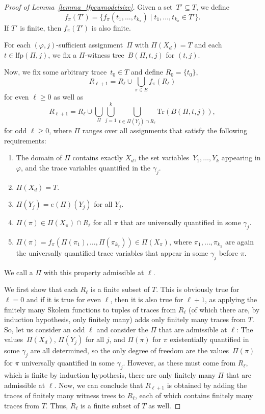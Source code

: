 \documentclass[dvipsnames,10pt,a4paper]{amsart}
\theoremstyle{definition}
\theoremstyle{remark}
\renewcommand{\phi}{\varphi}
\newcommand{\set}[1]{\{#1\}}
\newcommand{\unidisvar}{X_d}
\newcommand{\traces}{\mathrm{Tr}}
\newcommand{\lfp}{\mathrm{lfp}}
\newcommand{\tree}{B}
\newcommand{\itereval}{e}
\begin{document}
\begin{proof}[Proof of Lemma~\ref{lemma_lfpcwmodelsize}]
Given a set~$T' \subseteq T$, we define 
\[f_{\pi}(T') = \set{f_\pi(t_1, \ldots, t_{k_{\pi}}) \mid t_1, \ldots, t_{k_\pi} \in T' }.\]
If $T'$ is finite, then $f_{\pi}(T')$ is also finite. 

For each $(\phi,j)$-sufficient assignment~$\Pi$ with $\Pi(\unidisvar) = T$ and each $t \in \lfp(\Pi,j)$, we fix a $\Pi$-witness tree~$\tree(\Pi, t, j)$ for $(t,j)$. 

Now, we fix some arbitrary trace~$t_0 \in T$ and define $R_0 = \set{t_0}$,
\[
R_{\ell+1} = R_\ell \cup 
\bigcup_{\pi \in E} f_\pi(R_\ell) 
\]
for even $\ell \ge 0$ as well as
\[
R_{\ell+1} = R_\ell \cup \bigcup_{\Pi}\bigcup_{j=1}^k \bigcup_{t \in \Pi(Y_j) \cap R_\ell} \traces(\tree(\Pi, t, j)),
\]
for odd $\ell \ge 0$, where $\Pi$ ranges over all assignments that satisfy the following requirements:
\begin{enumerate}
    \item\label{admiss:domain} The domain of $\Pi$ contains exactly $\unidisvar$, the set variables~$ Y_1, \ldots, Y_k$ appearing in $\varphi$, and the trace variables quantified in the $\gamma_j$.
    \item\label{admiss:disc} $\Pi(\unidisvar) = T$.
    \item\label{admiss:set} $\Pi(Y_j) = \itereval(\Pi)(Y_j)$ for all $Y_j$.
    \item\label{admiss:univ} $\Pi(\pi) \in \Pi(X_\pi) \cap R_\ell$ for all $\pi$ that are universally quantified in some $\gamma_j$. 
    \item\label{admiss:ex} $\Pi(\pi) = f_\pi(\Pi(\pi_1), \ldots, \Pi(\pi_{k_\pi})) \in \Pi(X_\pi)$, where $\pi_1, \ldots, \pi_{k_\pi}$ are again the universally quantified trace variables that appear in some $\gamma_j$ before $\pi$.    
\end{enumerate}
We call a $\Pi$ with this property admissible at $\ell$.

We first show that each $R_\ell$ is a finite subset of $T$. This is obviously true for $\ell = 0$ and if it is true for even $\ell$, then it is also true for $\ell+1$, as applying the finitely many Skolem functions to tuples of traces from $R_\ell$ (of which there are, by induction hypothesis, only finitely many) adds only finitely many traces from $T$. 
So, let us consider an odd $\ell$ and consider the $\Pi$ that are admissible at $\ell$: The values~$\Pi(\unidisvar)$, $\Pi(Y_j)$ for all $j$, and $\Pi(\pi)$ for $\pi$ existentially quantified in some $\gamma_j$ are all determined, so the only degree of freedom are the values~$\Pi(\pi)$ for $\pi$ universally quantified in some $\gamma_j$.
However, as these must come from $R_\ell$, which is finite by induction hypothesis, there are only finitely many $\Pi$ that are admissible at $\ell$. Now, we can conclude that $R_{\ell+1}$ is obtained by adding the traces of finitely many witness trees to $R_\ell$, each of which contains finitely many traces from $T$. Thus, $R_\ell$ is a finite subset of $T$ as well.


\end{proof}
\end{document}
